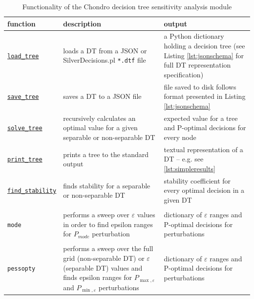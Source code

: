 \documentclass[a4paper,10pt,english]{sphinxmanual}
\begin{document}
	\begin{table}
		\begin{tabularx}{\textwidth}{|l|X|X|}
			\hline 
			\textbf{function} & \textbf{description} & \textbf{output}\\ \hline
			\hyperref[index:chondro.load_tree]{\texttt{load\_tree}} & loads a DT from a JSON or SilverDecisions.pl \texttt{*.dtf} file & a Python dictionary holding a decision tree (see Listing \ref{lst:jsonschema} for full DT representation specification)\\ \hline
			\hyperref[index:chondro.save_tree]{\texttt{save\_tree}} & saves a DT to a JSON file & file saved to disk follows format presented in Listing \ref{lst:jsonschema} \\ \hline
			\hyperref[index:chondro.solve_tree]{\texttt{solve\_tree}} & recursively calculates an optimal value for a given separable or non-separable DT & expected value for a tree and P-optimal decisions for every node \\ \hline
			\hyperref[index:chondro.print_tree]{\texttt{print\_tree}} & prints a tree to the standard output & textual representation of a DT -- e.g. see \ref{lst:simpleresults} \\ \hline			
			\hyperref[index:chondro.find_stability]{\texttt{find\_stability}} & finds stability for a separable or non-separable DT & stability coefficient for every optimal decision in a given DT 
			\\ \hline
			\hyperref[index:chondro.find_perturbation_mode]{\pbox{5cm}{
					\texttt{find\_}\texttt{perturbation\_}\\ \texttt{mode}}} & performs a sweep over $\varepsilon$ values in order to find epsilon ranges for $P_{mode}$ perturbation & dictionary of $\varepsilon$ ranges and P-optimal decisions for perturbations
			\\ \hline
			\hyperref[index:chondro.find_perturbation_pessopty]{\pbox{5cm}{
					\texttt{find\_}\texttt{perturbation\_}\\ \texttt{pessopty}}} & performs a sweep over the full grid (non-separable DT) or $\varepsilon$ (separable DT) values and finds epsilon ranges for $P_{\max,\varepsilon}$ and $P_{\min,\varepsilon}$ perturbations & dictionary of $\varepsilon$ ranges and P-optimal decisions for perturbations
			\\ \hline			
		\end{tabularx} 
		\caption{Functionality of the Chondro decision tree sensitivity analysis module}\label{tab:chondro}
	\end{table}	
	
\end{document}
